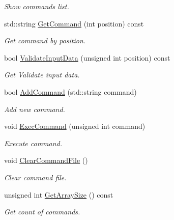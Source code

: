 \begin{DoxyCompactItemize}
\begin{DoxyCompactList}\small\item\em Show commands list. \end{DoxyCompactList}\item 
std::string \hyperlink{classcCommandProcess_ae0cd3a821061315489b79778a916e153}{GetCommand} (int position) const 
\begin{DoxyCompactList}\small\item\em Get command by position. \end{DoxyCompactList}\item 
bool \hyperlink{classcCommandProcess_a772e2a1a70fbc0664ac0c3f147d228ba}{ValidateInputData} (unsigned int position) const 
\begin{DoxyCompactList}\small\item\em Get Validate input data. \end{DoxyCompactList}\item 
bool \hyperlink{classcCommandProcess_a59680f067cb8cd12e656316eb88b5c49}{AddCommand} (std::string command)
\begin{DoxyCompactList}\small\item\em Add new command. \end{DoxyCompactList}\item 
void \hyperlink{classcCommandProcess_a97d77e430582c43476c9e08f62891820}{ExecCommand} (unsigned int command)
\begin{DoxyCompactList}\small\item\em Execute command. \end{DoxyCompactList}\item 
\hypertarget{classcCommandProcess_a110276a333c3dd6276e552e1b45d7239}{
void \hyperlink{classcCommandProcess_a110276a333c3dd6276e552e1b45d7239}{ClearCommandFile} ()}
\label{classcCommandProcess_a110276a333c3dd6276e552e1b45d7239}

\begin{DoxyCompactList}\small\item\em Clear command file. \end{DoxyCompactList}\item 
unsigned int \hyperlink{classcCommandProcess_aec7a504a34ffddd70ab8ca24dca723ea}{GetArraySize} () const 
\begin{DoxyCompactList}\small\item\em Get count of commands. \end{DoxyCompactList}\end{DoxyCompactItemize}


